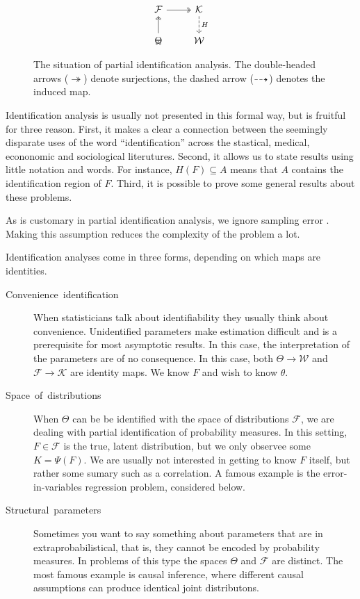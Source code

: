 \begin{figure}
\noindent \begin{centering}
\[
\begin{tikzcd}
\mathcal{F} \arrow[twoheadrightarrow]{r} & \mathcal{K} \arrow[dashed]{d}{H} \\
\Theta      \arrow[twoheadrightarrow]{u} \arrow[twoheadrightarrow]  & \mathcal{W}
\end{tikzcd}
\]
\par\end{centering}
\caption{\label{fig:partial identifiaction situation-1}The situation of partial
identification analysis. The double-headed arrows ($\twoheadrightarrow$)
denote surjections, the dashed arrow ($\protect\dashrightarrow$)
denotes the induced map.}
\end{figure}

Identification analysis is usually not presented in this formal way,
but is fruitful for three reason. First, it makes a clear a connection
between the seemingly disparate uses of the word ``identification''
across the stastical, medical, econonomic and sociological literutures.
Second, it allows us to state results using little notation and words.
For instance, $H(F)\subseteq A$ means that $A$ contains the identification
region of $F$. Third, it is possible to prove some general results
about these problems. 

As is customary in partial identification analysis, we ignore sampling
error \parencite{Manski2003-aq}. Making this assumption reduces the complexity
of the problem a lot. 

Identification analyses come in three forms, depending on which maps
are identities. 
\begin{description}
\item [{Convenience~identification}] When statisticians talk about identifiability
they usually think about convenience. Unidentified parameters make
estimation difficult and is a prerequisite for most asymptotic results.
In this case, the interpretation of the parameters are of no consequence.
In this case, both $\Theta\to\mathcal{W}$ and $\mathcal{F}\to\mathcal{K}$
are identity maps. We know $F$ and wish to know $\theta$. 
\item [{Space~of~distributions}] When $\Theta$ can be be identified
with the space of distributions $\mathcal{F}$, we are dealing with
partial identification of probability measures. In this setting, $F\in\mathcal{F}$
is the true, latent distribution, but we only observee some $K=\Psi(F)$.
We are usually not interested in getting to know $F$ itself, but
rather some sumary such as a correlation. A famous example is the
error-in-variables regression problem, considered below.
\item [{Structural~parameters}] Sometimes you want to say something about
parameters that are in extraprobabilistical, that is, they cannot
be encoded by probability measures. In problems of this type the spaces
$\Theta$ and $\mathcal{F}$ are distinct. The most famous example
is causal inference, where different causal assumptions can produce
identical joint distributons. 
\end{description}

